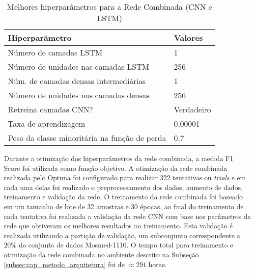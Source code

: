 \begin{table}[]
\centering
\caption{Melhores hiperparâmetros para a Rede Combinada (CNN e LSTM)}
\label{table:met_best_hpo_rnn}
\begin{tabular}{@{}ll@{}}
\toprule
Hiperparâmetro                        & Valores    \\ \midrule
Número de camadas LSTM                & 1          \\
Número de unidades nas camadas LSTM   & 256        \\
Núm. de camadas densas intermediárias & 1          \\
Número de unidades nas camadas densas & 256        \\
Retreina camadas CNN?                 & Verdadeiro \\
Taxa de aprendizagem                  & 0,00001    \\
Peso da classe minoritária na função de perda   & 0,7        \\ \bottomrule
\end{tabular}
\end{table}



Durante a otimização dos hiperparâmetros da rede combinada, a medida F1 Score foi utilizada como função objetivo. A otimização da rede combinada realizada pelo Optuna foi configurado para realizar 322 tentativas ou \textit{trials} e em cada uma delas foi realizado o preprocessamento dos dados, aumento de dados, treinamento e validação da rede. O treinamento da rede combinada foi baseado em um tamanho de lote de 32 amostras e 30 épocas, ao final do treinamento de cada tentativa foi realizada a validação da rede CNN com base nos parâmetros da rede que obtiveram os melhores resultados no treinamento. Esta validação é realizada utilizando a partição de validação, um subconjunto correspondente a 20\% do conjunto de dados Mosmed-1110. O tempo total para treinamento e otimização da rede combinada no ambiente descrito na Subseção \ref{subsec:cap_metodo_arquitetura} foi de $\approx 291$ horas.

